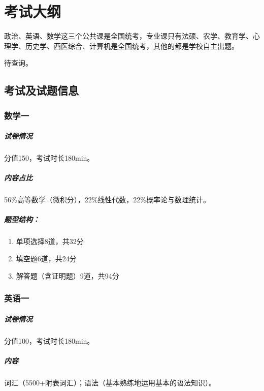 \chapter{考试大纲}

\begin{intro}
    政治、英语、数学这三个公共课是全国统考，专业课只有法硕、农学、教育学、心理学、历史学、西医综合、计算机是全国统考，其他的都是学校自主出题。
\end{intro}

待查询。

\section{考试及试题信息}
\subsection{数学一}
\paragraph{试卷情况} 分值150，考试时长180min。
\paragraph{内容占比} 56\%高等数学（微积分），22\%线性代数，22\%概率论与数理统计。
\paragraph{题型结构：}
\begin{enumerate}
    \item 单项选择8道，共32分
    \item 填空题6道，共24分
    \item 解答题（含证明题）9道，共94分
\end{enumerate}

\subsection{英语一}
\paragraph{试卷情况} 分值100，考试时长180min。
\paragraph{内容}词汇（5500+附表词汇）；语法（基本熟练地运用基本的语法知识）。
